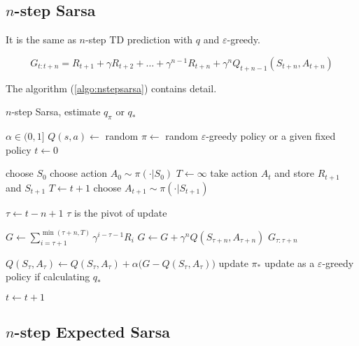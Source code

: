 \subsection{$n$-step Sarsa}

It is the same as $n$-step TD prediction with $q$ and $\varepsilon$-greedy. 

\begin{equation}
	G_{t:t+n} = R_{t+1} + \gamma R_{t+2} + \dots + \gamma^{n-1} R_{t+n} + \gamma^n Q_{t+n-1}(S_{t+n},A_{t+n})
\end{equation}


The algorithm (\ref{algo:nstepsarsa}) contains detail.


\begin{algorithm}
	\caption{$n$-step Sarsa, estimate $q_\pi$ or $q_*$}\label{algo:nstepsarsa}	
	
	\begin{algorithmic}[1]
		\State $ \alpha \in (0,1]$
		\State $Q(s,a) \gets$ random
		\State $\pi \gets$ random $\varepsilon$-greedy policy or a given fixed policy
		\State $t \gets 0$
		
		\Statex
		
		\Loop
			\State choose $S_0$
			\State choose action $A_0 \sim \pi (\cdot | S_0)$
			\State $T \gets \infty$
					\State take action $A_t$ and store $R_{t+1}$ and $S_{t+1}$
						\State $T \gets t+1$
					\Else
						\State choose $A_{t+1} \sim \pi(\cdot|S_{t+1})$
					\EndIf
				\EndIf
				
				\State $\tau \gets t - n + 1$ \Comment $\tau$ is the pivot of update
				
					\State $G \gets \sum\limits_{i=\tau+1}^{\min (\tau+n,T)} \gamma^{i-\tau-1} R_i$
						\State $G \gets G + \gamma^n Q(S_{\tau + n}, A_{\tau + n})$ \Comment $G_{\tau:\tau+n}$
					\EndIf
					
					\State $Q(S_{\tau}, A_{\tau}) \gets Q(S_{\tau}, A_{\tau}) + \alpha \Big(G - Q(S_{\tau}, A_{\tau})\Big)$
					\State update $\pi_*$ \Comment update as a $\varepsilon$-greedy policy if calculating $q_*$
				\EndIf

				\State $t \gets t+1$ 
			\EndWhile
		\EndLoop
	\end{algorithmic}
\end{algorithm}



\subsection{$n$-step Expected Sarsa}

